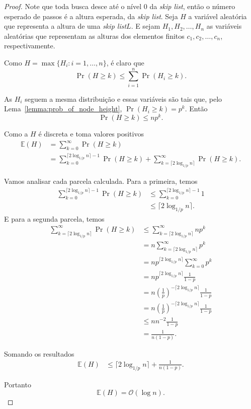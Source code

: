 \documentclass[paper=a4, fontsize=11pt]{scrartcl} %
\numberwithin{equation}{section}
\numberwithin{figure}{section}
\numberwithin{table}{section}
\numberwithin{definition}{section}
\numberwithin{theorem}{section}
\numberwithin{property}{section}
\numberwithin{proposition}{section}
\newcommand{\cO}{\ensuremath{\mathcal{O}}}
\newcommand{\skl}{\textit{skip list}\xspace}
\newcommand{\Exp}{\ensuremath{{\mathbb{E}}}\xspace}
\begin{document}
\begin{proof}

Note que toda busca desce até o nível 0 da \skl, então o número esperado de passos é a altura esperada, da \skl. Seja $H$ a variável aleatória que representa a altura de uma \skl $L$. E sejam 
$H_1, H_2, \ldots, H_n$ as variáveis aleatórias que representam as alturas dos elementos finitos
$c_1, c_2, \ldots, c_n$, respectivamente.

Como $H = \max \{H_i : i = 1, \ldots, n \}$, é claro que
$$
\Pr(H \geq k) \leq \sum_{i=1}^n \Pr(H_i \geq k).
$$

As $H_i$ seguem a mesma distribuição e essas variáveis são tais que, pelo Lema~\ref{lemma:prob_of_node_height},  
 $ \Pr(H_i \geq k) = p^k$. Então
$$
\Pr(H \geq k) \leq np^k.
$$

Como a $H$ é discreta e toma valores positivos
\begin{align*}
\Exp(H) &= \sum_{k = 0}^{\infty} \Pr(H \geq k)  \\
        &= \sum_{k = 0}^{\lceil 2 \log_{1/p} n \rceil - 1} \Pr(H \geq k) +
        \sum_{k = \lceil 2 \log_{1/p} n \rceil}^{\infty} \Pr(H \geq k).
\end{align*}

Vamos analisar cada parcela calculada. Para a primeira, temos
\begin{align*}
\sum_{k = 0}^{\lceil 2 \log_{1/p} n \rceil - 1} \Pr(H \geq k) &\leq 
  \sum_{k = 0}^{\lceil 2 \log_{1/p} n \rceil - 1} 1 \\
&\leq \lceil 2 \log_{1/p} n \rceil.
\end{align*}
E para a segunda parcela, temos
\begin{align*}
\sum_{k = \lceil 2 \log_{1/p} n \rceil}^{\infty} \Pr(H \geq k) 
   &\leq \sum_{k = \lceil 2 \log_{1/p} n \rceil}^{\infty} np^k \\
   &= n \sum_{k = \lceil 2 \log_{1/p} n \rceil}^{\infty} p^k \\
   &= n p^{\lceil 2 \log_{1/p} n \rceil} \sum_{k = 0}^{\infty} p^k \\
   &= n p^{\lceil 2 \log_{1/p} n \rceil} \frac{1}{1 - p} \\
   &= n \left( \frac{1}{p} \right)^{- \lceil 2 \log_{1/p} n \rceil} \frac{1}{1 - p} \\
   &= n \left( \frac{1}{p} \right)^{- \lceil 2 \log_{1/p} n \rceil} \frac{1}{1 - p} \\
   &\leq n n^{-2} \frac{1}{1 - p} \\
   &= \frac{1}{n(1 - p)}.
\end{align*}

Somando os resultados
\begin{align*}
\Exp(H) &\leq \lceil 2 \log_{1/p} n \rceil + \frac{1}{n(1 - p)}.
\end{align*}

Portanto
$$
\Exp(H) = \cO(\log n).
$$
\end{proof}
\end{document}
